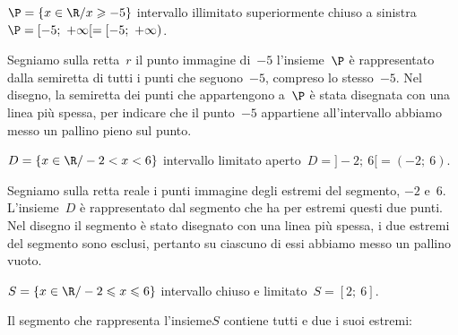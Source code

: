 \begin{esempio}{}{}
\(\P=\{x \in \R/x \geqslant -5\}\) intervallo illimitato superiormente 
chiuso a sinistra~\(\P = [-5;~+\infty[ = [-5;~+\infty)\).

Segniamo sulla retta~\(r\) il punto immagine di~\(-5\)
l'insieme~\(\P\) è rappresentato dalla semiretta di tutti
i punti che seguono~\(-5\), compreso lo stesso~\(-5\). Nel disegno, la
semiretta dei punti che appartengono a~\(\P\) è stata disegnata con una
linea più spessa, per indicare che il punto~\(-5\) appartiene
all'intervallo abbiamo messo un pallino pieno sul punto.
\vspace{-.5em}
\begin{center}
\end{center}
\end{esempio}

\begin{esempio}{}{}
 \(D=\{x\in \R/-2<x<6\}\) intervallo limitato 
 aperto~\(D = ]-2;~6[ = (-2;~6)\).

Segniamo sulla retta reale i punti immagine degli estremi del segmento,
\(-2\) e~6. L'insieme~\(D\) è rappresentato dal segmento che
ha per estremi questi due punti. Nel disegno il segmento è stato
disegnato con una linea più spessa, i due estremi del segmento sono
esclusi, pertanto su ciascuno di essi abbiamo messo un pallino vuoto.
\vspace{-.5em}
\begin{center}
\end{center}
\end{esempio}

% 

\begin{esempio}{}{}
\(S=\{x\in \R/-2 \leqslant x \leqslant 6\}\) intervallo chiuso e 
limitato~\(S = [2;~6]\).

Il segmento che rappresenta l'insieme\(S\) contiene tutti e
due i suoi estremi:
\vspace{-.5em}
\begin{center}
\end{center}
\end{esempio}

